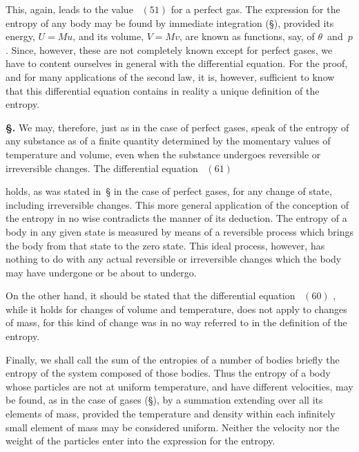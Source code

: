 \documentclass[12pt]{book}[2005/09/16]
\newcommand{\Section}[1]{
  \medskip\par\textbf{§\;#1}
  \label{section:#1}
}
\newcommand{\SecRef}[2][§\;]{\hyperref[section:#2.]{{\upshape #1#2}}}
\newcommand{\Eq}[1]{%
  \hyperref[eqn:#1]{\ensuremath{#1}}%
}
\newcommand{\PageSep}[1]{\ignorespaces}
\begin{document}
This, again, leads to the value~\Eq{(51)} for a perfect gas.
The expression for the entropy of any body may be found
by immediate integration (\SecRef{254}), provided its energy,
$U = Mu$, and its volume, $V = Mv$, are known as functions,
say, of $\theta$~and~$p$. Since, however, these are not completely
known except for perfect gases, we have to content ourselves
in general with the differential equation. For the proof,
and for many applications of the second law, it is, however,
sufficient to know that this differential equation contains
in reality a unique definition of the entropy.

\Section{131.} We may, therefore, just as in the case of perfect
gases, speak of the entropy of any substance as of a finite
quantity determined by the momentary values of temperature
and volume, even when the substance undergoes
reversible or irreversible changes. The differential equation~\Eq{(61)}
holds, as was stated in~\SecRef{120} in the case of perfect
gases, for any change of state, including irreversible changes.
This more general application of the conception of the
entropy in no wise contradicts the manner of its deduction.
The entropy of a body in any given state is measured by
means of a reversible process which brings the body from
that state to the zero state. This ideal process, however,
has nothing to do with any actual reversible or irreversible
changes which the body may have undergone or be about
to undergo.

On the other hand, it should be stated that the differential
equation~\Eq{(60)}, while it holds for changes of volume
and temperature, does not apply to changes of mass, for
\PageSep{99}
this kind of change was in no way referred to in the
definition of the entropy.

Finally, we shall call the sum of the entropies of a
number of bodies briefly the entropy of the system composed
of those bodies. Thus the entropy of a body whose particles
are not at uniform temperature, and have different velocities,
may be found, as in the case of gases (\SecRef{127}), by a summation
extending over all its elements of mass, provided
the temperature and density within each infinitely small
element of mass may be considered uniform. Neither the
velocity nor the weight of the particles enter into the
expression for the entropy.
\end{document}
